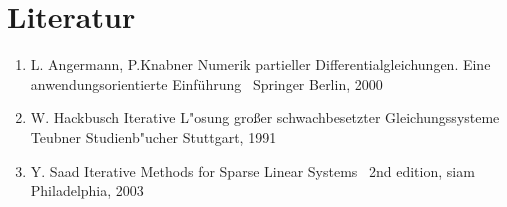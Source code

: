 \section{Literatur}
\begin{enumerate}
\item L. Angermann, P.Knabner \glqq Numerik partieller Differentialgleichungen. Eine anwendungsorientierte Einführung \grqq\, Springer Berlin, 2000
\item W. Hackbusch \glqq Iterative L"osung großer schwachbesetzter Gleichungssysteme \glqq\, Teubner Studienb"ucher Stuttgart, 1991
\item Y. Saad \glqq Iterative Methods for Sparse Linear Systems \grqq\, 2nd edition, siam Philadelphia, 2003 
\end{enumerate}
